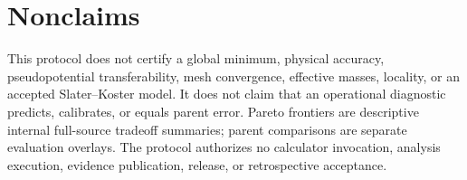 \documentclass[11pt]{report}
\begin{document}
\chapter{Nonclaims}

This protocol does not certify a global minimum, physical accuracy, pseudopotential
transferability, mesh convergence, effective masses, locality, or an accepted
Slater--Koster model.  It does not claim that an operational diagnostic predicts,
calibrates, or equals parent error.  Pareto frontiers are descriptive internal
full-source tradeoff summaries; parent comparisons are separate evaluation overlays.
The protocol authorizes no calculator invocation, analysis execution, evidence
publication, release, or retrospective acceptance.
\end{document}

